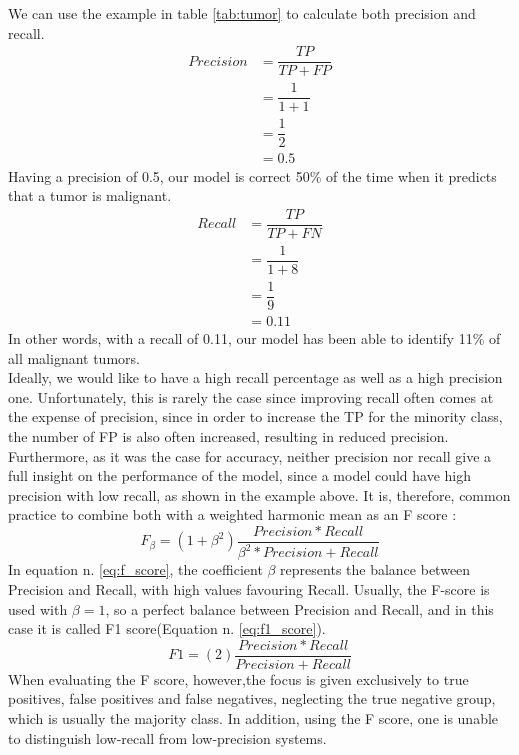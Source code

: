 We can use the example in table \ref{tab:tumor} to calculate both precision and recall. 
\begin{equation}
\begin{aligned}
Precision &= \dfrac{TP}{TP+FP}\\
          &= \dfrac{1}{1+1}\\
          &= \dfrac{1}{2}\\
          &= 0.5
\end{aligned}
\label{eq:pre_ex}    
\end{equation}
Having a precision of 0.5, our model is correct 50\% of the time when it predicts that a tumor is malignant. 
\begin{equation}
\begin{aligned}
Recall &= \dfrac{TP}{TP+FN}\\
          &= \dfrac{1}{1+8}\\
          &= \dfrac{1}{9}\\
          &= 0.11
\end{aligned}
\label{eq:rec2}    
\end{equation}
In other words, with a recall of 0.11, our model has been able to identify 11\% of all malignant tumors. \\
Ideally, we would like to have a high recall percentage as well as a high precision one. Unfortunately, this is rarely the case since improving recall often comes at the expense of precision, since in order to increase the TP for the minority class, the number of FP is also often increased, resulting in reduced precision. \cite{10.5555/2559492}\\
Furthermore, as it was the case for accuracy, neither precision nor recall give a full insight on the performance of the model, since a model could have high precision with low recall, as shown in the example above. It is, therefore, common practice to combine both with a weighted harmonic mean as an F score \cite{Rijsbergen1974FOUNDATIONOE}:
\begin{equation}
F_\beta = (1+ \beta ^2)\dfrac{Precision * Recall}{\beta ^2* Precision + Recall}
\label{eq:f_score}    
\end{equation}
In equation n. \ref{eq:f_score}, the coefficient $\beta$ represents the balance between Precision and Recall, with high values favouring Recall. Usually, the F-score is used with $\beta =1$, so a perfect balance between Precision and Recall, and in this case it is called F1 score(Equation n. \ref{eq:f1_score}). \cite{derczynski-2016-complementarity}
\begin{equation}
F1 = (2)\dfrac{Precision * Recall}{Precision + Recall}
\label{eq:f1_score}    
\end{equation}
When evaluating the F score, however,the focus is given exclusively to true positives, false positives and false negatives, neglecting the true negative group, which is usually the majority class. In addition, using the F score, one is unable to distinguish low-recall from low-precision systems. \cite{derczynski-2016-complementarity}\\
